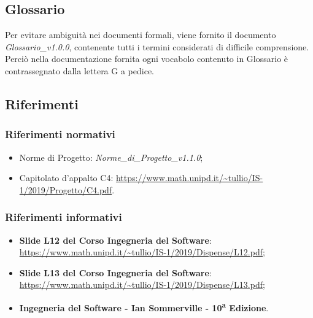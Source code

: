 \subsection{Glossario}
Per evitare ambiguità nei documenti formali, viene fornito il documento \textit{Glossario\_v1.0.0},
contenente tutti i termini considerati di difficile comprensione. Perciò nella documentazione fornita ogni vocabolo contenuto in Glossario è contrassegnato dalla lettera G a pedice.

\subsection{Riferimenti}
\subsubsection{Riferimenti normativi}
\begin{itemize}
	\item Norme di Progetto: \textit{Norme\_di\_Progetto\_v1.1.0};
	\item Capitolato d'appalto C4: \url{https://www.math.unipd.it/~tullio/IS-1/2019/Progetto/C4.pdf}.
	\begin{comment}
	Eliminati riferimenti a ISO 9126 e 15504
	\end{comment}
\end{itemize}
\subsubsection{Riferimenti informativi}
\begin{itemize}
	\begin{comment}
	Spostato le norme a riferimento normativo
	\end{comment}
	\item \textbf{Slide L12 del Corso Ingegneria del Software}:\\
	\url{https://www.math.unipd.it/~tullio/IS-1/2019/Dispense/L12.pdf};
	\item \textbf{Slide L13 del Corso Ingegneria del Software}:\\
	\url{https://www.math.unipd.it/~tullio/IS-1/2019/Dispense/L13.pdf};
	\item \textbf{Ingegneria del Software - Ian Sommerville - 10\textsuperscript{a} Edizione}.
\end{itemize}